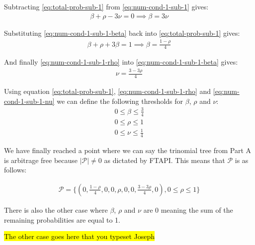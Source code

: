 \documentclass{article}
\begin{document}
Subtracting \ref{eq:total-prob-sub-1} from  \ref{eq:num-cond-1-sub-1} gives:
\begin{align}
    \beta  + \rho - 3\nu = 0 \implies \beta = 3\nu \label{eq:num-cond-1-sub-1-beta}
\end{align}

Substituting \ref{eq:num-cond-1-sub-1-beta} back into \ref{eq:total-prob-sub-1} gives:
\begin{align}
    \beta  + \rho + 3\beta = 1 \implies \beta = \frac{1-\rho}{4} \label{eq:num-cond-1-sub-1-rho}
\end{align}

And finally \ref{eq:num-cond-1-sub-1-rho} into \ref{eq:num-cond-1-sub-1-beta} gives:
\begin{align}
    \nu = \frac{3-3\rho}{4} \label{eq:num-cond-1-sub-1-nu}
\end{align}

Using equation \ref{eq:total-prob-sub-1}, \ref{eq:num-cond-1-sub-1-rho} and \ref{eq:num-cond-1-sub-1-nu} we can define the following thresholds for $\beta$, $\rho$ and $\nu$:
\begin{align*}
    0 \leq \beta \leq \frac{3}{4} \\
    0 \leq \rho \leq 1 \\
    0 \leq \nu \leq \frac{1}{4}
\end{align*}

We have finally reached a point where we can say the trinomial tree from Part A is arbitrage free because $|\mathcal{P}|\neq0$ as dictated by FTAPI. This means that $\mathcal{P}$ is as follows:

\begin{align*}
    \mathcal{P} = \{ (0, \frac{1-\rho}{4}, 0, 0 , \rho, 0, 0, \frac{3-3\rho}{4}, 0), 0 \leq \rho \leq 1 \}
\end{align*}

There is also the other case where $\beta$, $\rho$ and $\nu$ are 0 meaning the sum of the remaining probabilities are equal to 1.

\hl{The other case goes here that you typeset Joseph}
\end{document}
